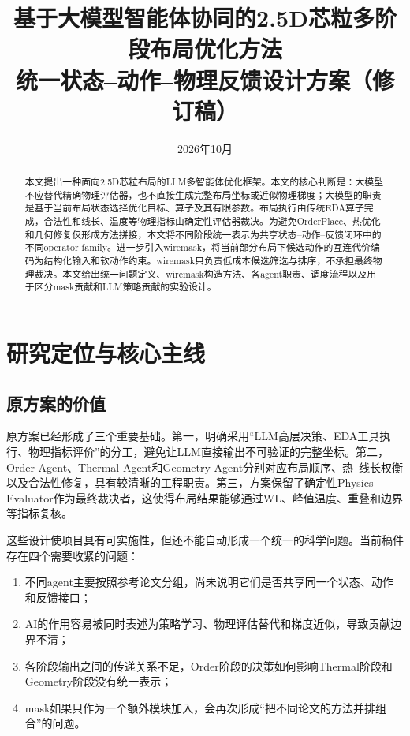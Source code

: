 \documentclass[UTF8,a4paper,12pt]{ctexart}
\title{基于大模型智能体协同的2.5D芯粒多阶段布局优化方法\\
\large 统一状态--动作--物理反馈设计方案（修订稿）}
\author{}
\date{2026年10月}
\begin{document}
\maketitle

\begin{abstract}
本文提出一种面向2.5D芯粒布局的LLM多智能体优化框架。本文的核心判断是：大模型不应替代精确物理评估器，也不直接生成完整布局坐标或近似物理梯度；大模型的职责是基于当前布局状态选择优化目标、算子及其有限参数。布局执行由传统EDA算子完成，合法性和线长、温度等物理指标由确定性评估器裁决。为避免OrderPlace、热优化和几何修复仅形成方法拼接，本文将不同阶段统一表示为共享状态--动作--反馈闭环中的不同operator family。进一步引入wiremask，将当前部分布局下候选动作的互连代价编码为结构化输入和软动作约束。wiremask只负责低成本候选筛选与排序，不承担最终物理裁决。本文给出统一问题定义、wiremask构造方法、各agent职责、调度流程以及用于区分mask贡献和LLM策略贡献的实验设计。
\end{abstract}

\section{研究定位与核心主线}

\subsection{原方案的价值}

原方案已经形成了三个重要基础。第一，明确采用“LLM高层决策、EDA工具执行、物理指标评价”的分工，避免让LLM直接输出不可验证的完整坐标。第二，Order Agent、Thermal Agent和Geometry Agent分别对应布局顺序、热--线长权衡以及合法性修复，具有较清晰的工程职责。第三，方案保留了确定性Physics Evaluator作为最终裁决者，这使得布局结果能够通过WL、峰值温度、重叠和边界等指标复核。

这些设计使项目具有可实施性，但还不能自动形成一个统一的科学问题。当前稿件存在四个需要收紧的问题：

\begin{enumerate}[leftmargin=2.5em]
  \item 不同agent主要按照参考论文分组，尚未说明它们是否共享同一个状态、动作和反馈接口；
  \item AI的作用容易被同时表述为策略学习、物理评估替代和梯度近似，导致贡献边界不清；
  \item 各阶段输出之间的传递关系不足，Order阶段的决策如何影响Thermal阶段和Geometry阶段没有统一表示；
  \item mask如果只作为一个额外模块加入，会再次形成“把不同论文的方法并排组合”的问题。
\end{enumerate}
\end{document}
